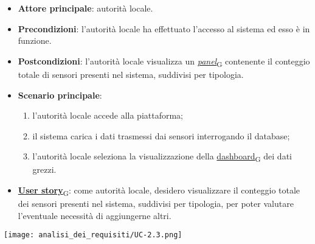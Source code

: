 \newpage
{}
\begin{itemize}
	\item \textbf{Attore principale}: autorità locale.
	\item \textbf{Precondizioni}: l'autorità locale ha effettuato l'accesso al sistema ed esso è in funzione.
	\item \textbf{Postcondizioni}: l'autorità locale visualizza un \href{https://7last.github.io/docs/pb/documentazione-interna/glossario\#panel}{\textit{panel}\textsubscript{G}} contenente il conteggio totale di sensori presenti nel sistema, suddivisi per tipologia.
	\item \textbf{Scenario principale}:
	      \begin{enumerate}
		      \item l'autorità locale accede alla piattaforma;
		      \item il sistema carica i dati trasmessi dai sensori interrogando il database;
		      \item l'autorità locale seleziona la visualizzazione della \href{https://7last.github.io/docs/pb/documentazione-interna/glossario\#dashboard}{dashboard\textsubscript{G}} dei dati grezzi.
	      \end{enumerate}
	\item \href{https://7last.github.io/docs/pb/documentazione-interna/glossario\#user-story}{\textbf{User story}\textsubscript{G}}:
	      come autorità locale, desidero visualizzare il conteggio totale dei sensori presenti nel sistema, suddivisi per tipologia, per poter valutare l'eventuale necessità di aggiungerne altri.
\end{itemize}
\begin{center}
	\texttt{[image: analisi\_dei\_requisiti/UC-2.3.png]}
\end{center}

